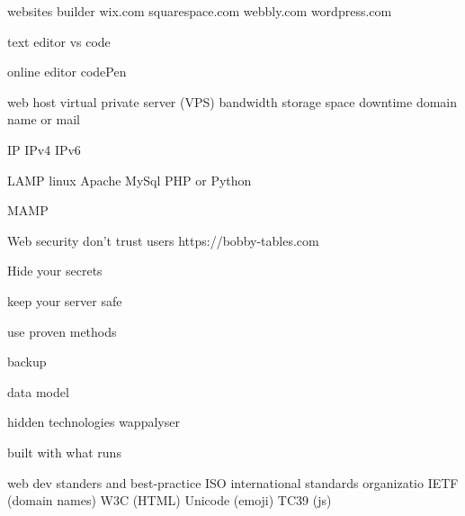 websites builder
  wix.com 
  squarespace.com
  webbly.com
  wordpress.com 

text editor 
  vs code 


online editor
  codePen 

web host 
  virtual private server (VPS)
  bandwidth 
  storage space 
  downtime 
  domain name or mail 

IP 
  IPv4
  IPv6 

LAMP 
  linux 
  Apache 
  MySql 
  PHP or Python 

  MAMP

Web security 
  don't trust users 
  https://bobby-tables.com

  Hide your secrets 

  keep your server safe 

  use proven methods 

  backup 

data model 


hidden technologies 
  wappalyser 

  built with 
  what runs 

web dev standers and best-practice 
  ISO    international standards organizatio
  IETF (domain names)
  W3C (HTML)  
  Unicode (emoji)
  TC39 (js)